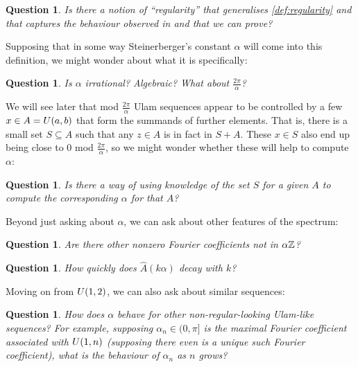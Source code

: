 \documentclass{report}
\newtheorem{question}[theorem]{Question}
\theoremstyle{remark}
\numberwithin{equation}{section}
\begin{document}
\begin{question}\label{qn:regularity_def}
  Is there a notion of ``regularity'' that generalises
  \ref{def:regularity} and that captures the behaviour observed in
  \cite{steinerberger:preprint} and that we can prove?
\end{question}

Supposing that in some way Steinerberger's constant $\alpha$ will come
into this definition, we might wonder about what it is specifically:

\begin{question}\label{qn:rationality}
  Is $\alpha$ irrational?  Algebraic?  What about
  $\frac{2\pi}{\alpha}$?  
\end{question}

We will see later that mod $\frac{2\pi}{\alpha}$ Ulam sequences appear
to be controlled by a few $x \in A =U(a,b)$ that form the
summands of further elements.  That is, there is a small set
$S \subseteq A$ such that any $z \in A$ is in fact in $S+A$.  These $x
\in S$ also end up being close to 0 mod $\frac{2\pi}{\alpha}$, so we
might wonder whether these will help to compute $\alpha$: 

\begin{question}\label{qn:compute_alpha}
  Is there a way of using knowledge of the set $S$ for a given $A$ to
  compute the corresponding $\alpha$ for that $A$?
\end{question}

Beyond just asking about $\alpha$, we can ask about other features of
the spectrum: 

\begin{question}\label{qn:spectrum}
  Are there other nonzero Fourier coefficients not in $\alpha\mathbb{Z}$?
\end{question}

\begin{question}\label{qn:decay}
  How quickly does $\widehat{A}(k\alpha)$ decay with $k$?
\end{question}

Moving on from $U(1,2)$, we can also ask about similar sequences: 

\begin{question}\label{qn:other_alpha}
  How does $\alpha$ behave for other non-regular-looking Ulam-like
  sequences?  For example, supposing $\alpha_n \in (0,\pi]$ is the
  maximal Fourier coefficient associated with $U(1,n)$ (supposing
  there even is a unique such Fourier coefficient), what is the
  behaviour of $\alpha_n$ as $n$ grows?
\end{question}
\end{document}
